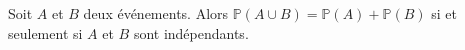Soit $A$ et $B$ deux événements. Alors $\mathbb{P}(A\cup B)=\mathbb{P}(A)+\mathbb{P}(B)$ si et seulement si $A$ et $B$ sont indépendants.

\begin{reponses}
\end{reponses}

